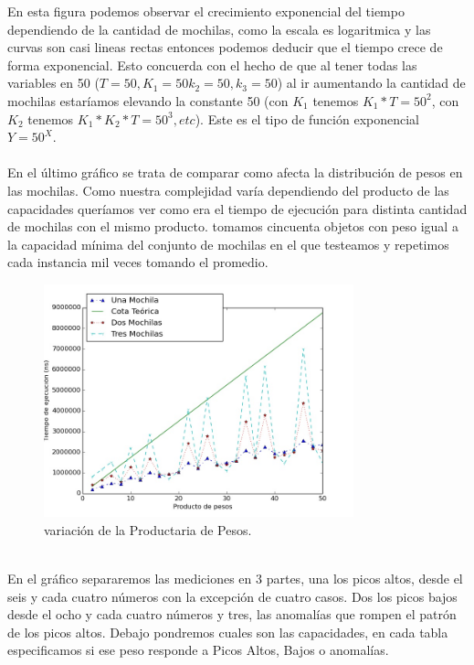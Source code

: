 \documentclass[spanish,12pt]{article}
\begin{document}
{En esta figura podemos observar el crecimiento exponencial del tiempo dependiendo de la cantidad de mochilas, como la escala es logaritmica y las curvas son casi lineas rectas entonces podemos deducir que el tiempo crece de forma exponencial. Esto concuerda con el hecho de que al tener todas las variables en 50 ($T=50, K_1 =50 k_2=50, k_3=50$) al ir aumentando la cantidad de mochilas estaríamos elevando la constante 50 (con $K_1$ tenemos $K_1*T=50^2$, con $K_2$ tenemos $K_1*K_2*T=50^3, etc $). Este es el tipo de función exponencial $Y=50^X$.
\\
\\
En el último gráfico se trata de comparar como afecta la distribución de pesos en las mochilas. Como nuestra complejidad varía dependiendo del producto de las capacidades queríamos ver como era el tiempo de ejecución para distinta cantidad de mochilas con el mismo producto. tomamos cincuenta objetos con peso igual a la capacidad mínima del conjunto de mochilas en el que testeamos y repetimos cada instancia mil veces tomando el promedio. 
\begin{figure}[H]
\centering
\includegraphics[width=0.8\textwidth]{MismoPesoCompRang}
\caption{variación de la Productaria de Pesos.}
\end{figure}
\\
En el gráfico separaremos las mediciones en 3 partes, una los picos altos, desde el seis y cada cuatro números con la excepción de cuatro casos. Dos los picos bajos desde el ocho y cada cuatro números y tres, las anomalías que rompen el patrón de los picos altos. Debajo pondremos cuales son las capacidades, en cada tabla especificamos si ese peso responde a Picos Altos, Bajos o anomalías.
\\


}
\end{document}
